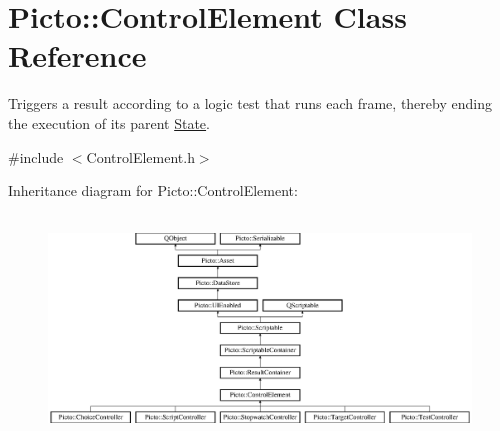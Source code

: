 \hypertarget{class_picto_1_1_control_element}{\section{Picto\-:\-:Control\-Element Class Reference}
\label{class_picto_1_1_control_element}
}


Triggers a result according to a logic test that runs each frame, thereby ending the execution of its parent \hyperlink{class_picto_1_1_state}{State}.  




{\ttfamily \#include $<$Control\-Element.\-h$>$}

Inheritance diagram for Picto\-:\-:Control\-Element\-:\begin{figure}[H]
\begin{center}
\leavevmode
\includegraphics[height=6.000000cm]{class_picto_1_1_control_element}
\end{center}
\end{figure}
